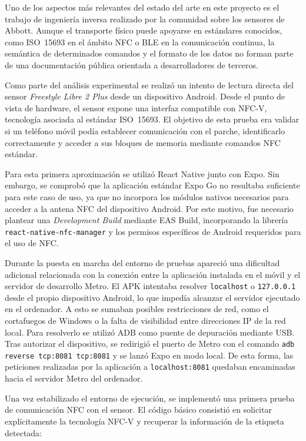 Uno de los aspectos más relevantes del estado del arte en este proyecto es el trabajo de
ingeniería inversa realizado por la comunidad sobre los sensores de Abbott. Aunque el
transporte físico puede apoyarse en estándares conocidos, como ISO~15693 en el ámbito NFC
o BLE en la comunicación continua, la semántica de determinados comandos y el formato de
los datos no forman parte de una documentación pública orientada a desarrolladores de
terceros.

Como parte del análisis experimental se realizó un intento de lectura directa del sensor
\textit{Freestyle Libre 2 Plus} desde un dispositivo Android. Desde el punto de vista de
hardware, el sensor expone una interfaz compatible con NFC-V, tecnología asociada al
estándar ISO~15693. El objetivo de esta prueba era validar si un teléfono móvil podía
establecer comunicación con el parche, identificarlo correctamente y acceder a sus
bloques de memoria mediante comandos NFC estándar.

Para esta primera aproximación se utilizó React Native junto con Expo. Sin embargo, se
comprobó que la aplicación estándar Expo Go no resultaba suficiente para este caso de
uso, ya que no incorpora los módulos nativos necesarios para acceder a la antena NFC del
dispositivo Android. Por este motivo, fue necesario plantear una \textit{Development
Build} mediante EAS Build, incorporando la librería \texttt{react-native-nfc-manager} y
los permisos específicos de Android requeridos para el uso de NFC.

Durante la puesta en marcha del entorno de pruebas apareció una dificultad adicional
relacionada con la conexión entre la aplicación instalada en el móvil y el servidor de
desarrollo Metro. El APK intentaba resolver \texttt{localhost} o \texttt{127.0.0.1} desde
el propio dispositivo Android, lo que impedía alcanzar el servidor ejecutado en el
ordenador. A esto se sumaban posibles restricciones de red, como el cortafuegos de
Windows o la falta de visibilidad entre direcciones IP de la red local. Para resolverlo
se utilizó ADB como puente de depuración mediante USB. Tras autorizar el dispositivo, se
redirigió el puerto de Metro con el comando \texttt{adb reverse tcp:8081 tcp:8081} y se
lanzó Expo en modo local. De esta forma, las peticiones realizadas por la aplicación a
\texttt{localhost:8081} quedaban encaminadas hacia el servidor Metro del ordenador.

Una vez estabilizado el entorno de ejecución, se implementó una primera prueba de
comunicación NFC con el sensor. El código básico consistió en solicitar explícitamente la
tecnología NFC-V y recuperar la información de la etiqueta detectada:

